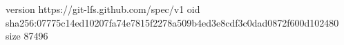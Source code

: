 version https://git-lfs.github.com/spec/v1
oid sha256:07775c14ed10207fa74e7815f2278a509b4ed3e8cdf3c0dad0872f600d102480
size 87496
